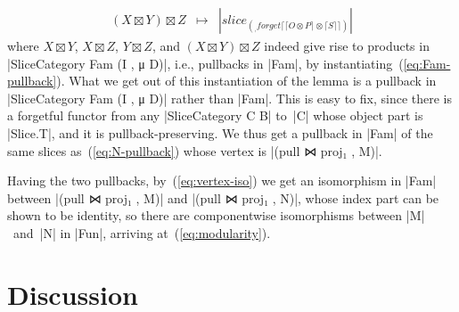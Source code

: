 \begin{itemize}
\[\begin{array}{rcl}
(X \boxtimes Y) \boxtimes Z  & \mapsto & |slice _ (_ , forget ⌈ ⌈ O ⊗ P ⌉ ⊗ ⌈ S ⌉ ⌉)|
\end{array} \]
where $X \boxtimes Y$, $X \boxtimes Z$, $Y \boxtimes Z$, and $(X \boxtimes Y) \boxtimes Z$ indeed give rise to products in |SliceCategory Fam (I , μ D)|, i.e., pullbacks in |Fam|, by instantiating~(\ref{eq:Fam-pullback}).
What we get out of this instantiation of the lemma is a pullback in |SliceCategory Fam (I , μ D)| rather than |Fam|.
This is easy to fix, since there is a forgetful functor from any |SliceCategory C B| to~|C| whose object part is |Slice.T|, and it is pullback-preserving.
We thus get a pullback in |Fam| of the same slices as~(\ref{eq:N-pullback}) whose vertex is |(pull ⋈ proj₁ , M)|.

\end{itemize}

Having the two pullbacks, by~(\ref{eq:vertex-iso}) we get an isomorphism in |Fam| between |(pull ⋈ proj₁ , M)| and |(pull ⋈ proj₁ , N)|, whose index part can be shown to be identity, so there are componentwise isomorphisms between |M|~and~|N| in |Fun|, arriving at~(\ref{eq:modularity}).

\section{Discussion}
\label{sec:categorical-discussion}

